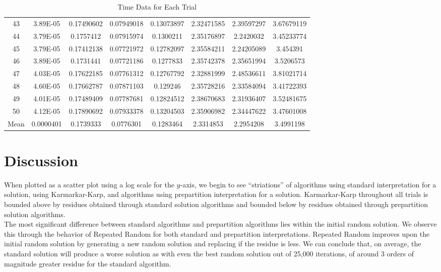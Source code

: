 \documentclass[11pt]{scrartcl}
\theoremstyle{dotlessP}
\theoremstyle{dotlessN}
\theoremstyle{dotN}
\begin{document}
\begin{table}[H]
{\begin{tabular}{c|c|c|c|c|c|c|c}
43    & 3.89E-05  & 0.17490602      & 0.07949018    & 0.13073897          & 2.32471585         & 2.39597297       & 3.67679119             \\
44    & 3.79E-05  & 0.1757412       & 0.07915974    & 0.1300211           & 2.35176897         & 2.2420032        & 3.45233774             \\
45    & 3.79E-05  & 0.17412138      & 0.07721972    & 0.12782097          & 2.35584211         & 2.24205089       & 3.454391               \\
46    & 3.89E-05  & 0.1731441       & 0.07721186    & 0.1277833           & 2.35742378         & 2.35651994       & 3.5206573              \\
47    & 4.03E-05  & 0.17622185      & 0.07761312    & 0.12767792          & 2.32881999         & 2.48536611       & 3.81021714             \\
48    & 4.60E-05  & 0.17662787      & 0.07871103    & 0.129246            & 2.35728216         & 2.33584094       & 3.41722393             \\
49    & 4.01E-05  & 0.17489409      & 0.07787681    & 0.12824512          & 2.38670683         & 2.31936407       & 3.52481675             \\
50    & 4.12E-05  & 0.17890692      & 0.07933378    & 0.13204503          & 2.35906982         & 2.34447622       & 3.47601008             \\
\hline
Mean  & 0.0000401 & 0.1739333       & 0.0776301     & 0.1283464           & 2.3314853          & 2.2954208        & 3.4991198             
\end{tabular}}
\caption{Time Data for Each Trial}
\end{table}
\section{Discussion}
When plotted as a scatter plot using a log scale for the $y$-axis, we begin to see ``striations'' of algorithms using standard interpretation for a solution, using Karmarkar-Karp, and algorithms using prepartition interpretation for a solution. Karmarkar-Karp throughout all trials is bounded above by residues obtained through standard solution algorithms and bounded below by residues obtained through prepartition solution algorithms.
\\

The most significant difference between standard algorithms and prepartition algorithms lies within the initial random solution. We observe this through the behavior of Repeated Random for both standard and prepartition interpretations. Repeated Random improves upon the initial random solution by generating a new random solution and replacing if the residue is less. We can conclude that, on average, the standard solution will produce a worse solution as with even the best random solution out of 25,000 iterations, of around 3 orders of magnitude greater residue for the standard algorithm. 
\\
\end{document}
